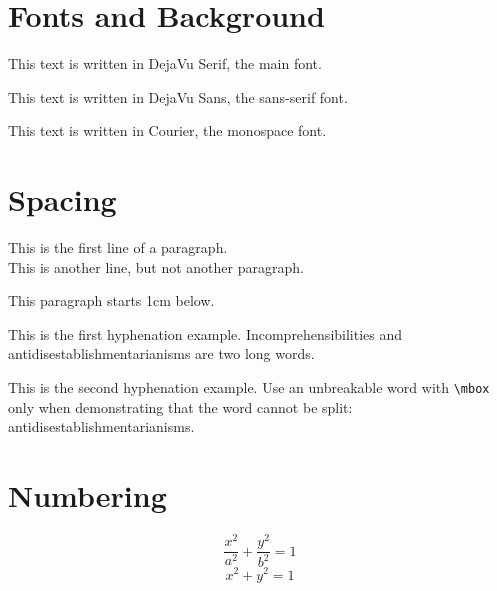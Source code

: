 \documentclass[12pt,a4paper]{article}
\begin{document}
\section{Fonts and Background}

\begin{trivlist}
\item This text is written in DejaVu Serif, the main font.
\item {\sffamily This text is written in DejaVu Sans, the sans-serif font.}
\item {\ttfamily This text is written in Courier, the monospace font.}
\end{trivlist}

\section{Spacing}

This is the first line of a paragraph.\\
This is another line, but not another paragraph.

\vspace{1cm}

This paragraph starts 1cm below.

\medskip
\noindent
\begin{minipage}{0.47\textwidth}
This is the first hyphenation example. Incomprehensibilities and
antidisestablishmentarianisms are two long words.
\end{minipage}\hfill
\begin{minipage}{0.47\textwidth}
This is the second hyphenation example. Use an unbreakable word
with \verb|\mbox| only when demonstrating that the word cannot
be split: \mbox{antidisestablishmentarianisms}.
\end{minipage}


\clearpage

\setcounter{section}{3}

\section{Numbering}

\begin{equation}
\frac{x^2}{a^2}+\frac{y^2}{b^2}=1
\label{eq:ellipse}
\end{equation}
\begin{equation}
x^2+y^2=1
\label{eq:circle}
\end{equation}
\end{document}
